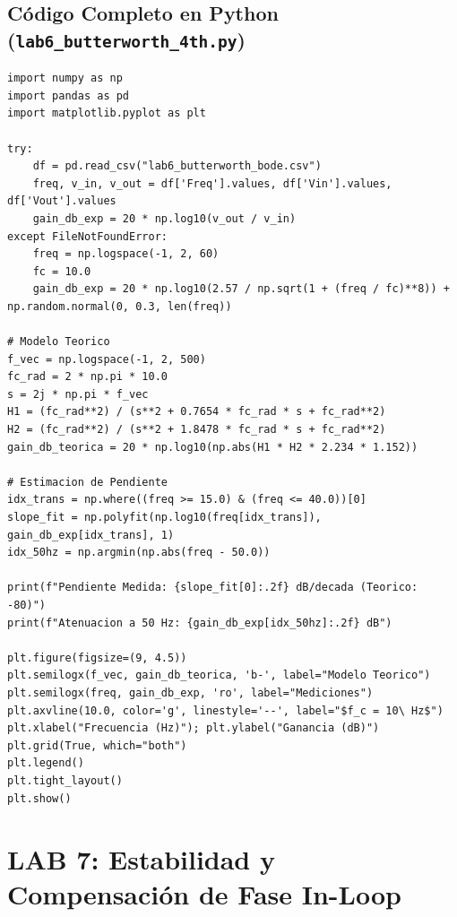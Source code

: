\documentclass[10pt,a4paper,twoside]{article}
\begin{document}
\subsection{Código Completo en Python (\texttt{lab6\_butterworth\_4th.py})}
\begin{lstlisting}
import numpy as np
import pandas as pd
import matplotlib.pyplot as plt

try:
    df = pd.read_csv("lab6_butterworth_bode.csv")
    freq, v_in, v_out = df['Freq'].values, df['Vin'].values, df['Vout'].values
    gain_db_exp = 20 * np.log10(v_out / v_in)
except FileNotFoundError:
    freq = np.logspace(-1, 2, 60)
    fc = 10.0
    gain_db_exp = 20 * np.log10(2.57 / np.sqrt(1 + (freq / fc)**8)) + np.random.normal(0, 0.3, len(freq))

# Modelo Teorico
f_vec = np.logspace(-1, 2, 500)
fc_rad = 2 * np.pi * 10.0
s = 2j * np.pi * f_vec
H1 = (fc_rad**2) / (s**2 + 0.7654 * fc_rad * s + fc_rad**2)
H2 = (fc_rad**2) / (s**2 + 1.8478 * fc_rad * s + fc_rad**2)
gain_db_teorica = 20 * np.log10(np.abs(H1 * H2 * 2.234 * 1.152))

# Estimacion de Pendiente
idx_trans = np.where((freq >= 15.0) & (freq <= 40.0))[0]
slope_fit = np.polyfit(np.log10(freq[idx_trans]), gain_db_exp[idx_trans], 1)
idx_50hz = np.argmin(np.abs(freq - 50.0))

print(f"Pendiente Medida: {slope_fit[0]:.2f} dB/decada (Teorico: -80)")
print(f"Atenuacion a 50 Hz: {gain_db_exp[idx_50hz]:.2f} dB")

plt.figure(figsize=(9, 4.5))
plt.semilogx(f_vec, gain_db_teorica, 'b-', label="Modelo Teorico")
plt.semilogx(freq, gain_db_exp, 'ro', label="Mediciones")
plt.axvline(10.0, color='g', linestyle='--', label="$f_c = 10\ Hz$")
plt.xlabel("Frecuencia (Hz)"); plt.ylabel("Ganancia (dB)")
plt.grid(True, which="both")
plt.legend()
plt.tight_layout()
plt.show()
\end{lstlisting}

\newpage
\section{LAB 7: Estabilidad y Compensación de Fase In-Loop}
\end{document}
